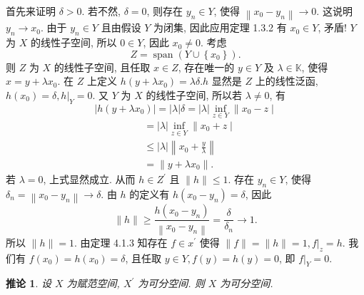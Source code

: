 \documentclass[openany]{ctexbook}
\makeatletter
\theoremstyle{kaiti}
\newtheorem{corollary}{推论}[section]
\theoremstyle{normal}
\renewenvironment{proof}[1][\proofname]{\par
    \pushQED{\qed}%
    \normalfont \topsep6\p@\@plus6\p@\relax
    \trivlist
    \item\relax
    {\heiti #1}\hspace{2\labelsep}\ignorespaces
  }{%
    \popQED\endtrivlist\@endpefalse
  }
\makeatother
\begin{document}
\begin{proof}
首先来证明 $\delta>0$. 若不然, $\delta=0$, 则存在 $y_n \in Y$, 使得 $\left\|x_0-y_n\right\| \rightarrow 0$. 这说明 $y_n \rightarrow x_0$. 由于 $y_n \in Y$ 且由假设 $Y$ 为闭集, 因此应用定理 1.3.2 有 $x_0 \in Y$, 矛盾!
$Y$ 为 $X$ 的线性子空间, 所以 $0 \in Y$, 因此 $x_0 \neq 0$. 考虑
$$
Z=\operatorname{span}\left(Y \cup\left\{x_0\right\}\right).
$$
则 $Z$ 为 $X$ 的线性子空间, 且任取 $x \in Z$, 存在唯一的 $y \in Y$ 及 $\lambda \in \mathbb{K}$, 使得 $x=y+\lambda x_0$. 在 $Z$ 上定义 $h\left(y+\lambda x_0\right)=\lambda \delta. h$ 显然是 $Z$ 上的线性泛函, $h\left(x_0\right)=\delta,\left.h\right|_{Y}=0$. 又 $Y$ 为 $X$ 的线性子空间, 所以若 $\lambda \neq 0$, 有
$$
\left|h\left(y+\lambda x_0\right)\right|=|\lambda| \delta=|\lambda| \inf_{z \in Y} \| x_0-z \mid
$$
$$
\begin{aligned}
&=|\lambda| \inf_{z \in Y} \| x_0+z \mid \\
&\leqslant|\lambda|\left\|x_0+\frac{y}{\lambda}\right\| \\
&=\left\|y+\lambda x_0\right\|.
\end{aligned}
$$
若 $\lambda=0$, 上式显然成立. 从而 $h \in Z^{\prime}$ 且 $\|h\| \leqslant 1$.
存在 $y_n \in Y$, 使得 $\delta_n=\left\|x_0-y_n\right\| \rightarrow \delta$. 由 $h$ 的定义有 $h\left(x_0-y_n\right)=\delta$, 因此
$$
\|h\| \geqslant \frac{h\left(x_0-y_n\right)}{\left\|x_0-y_n\right\|}=\frac{\delta}{\delta_n} \rightarrow 1.
$$
所以 $\|h\|=1$. 由定理 4.1.3 知存在 $f \in x^{\prime}$ 使得 $\|f\|=\|h\|=1,\left.f\right|_{z}=h$. 我们有 $f\left(x_0\right)=h\left(x_0\right)=\delta$, 且任取 $y \in Y, f(y)=h(y)=0$, 即 $\left.f\right|_{Y}=0$.
\end{proof}

\begin{corollary}
设 $X$ 为赋范空间, $X^{\prime}$ 为可分空间. 则 $X$ 为可分空间.
\end{corollary}
\end{document}
